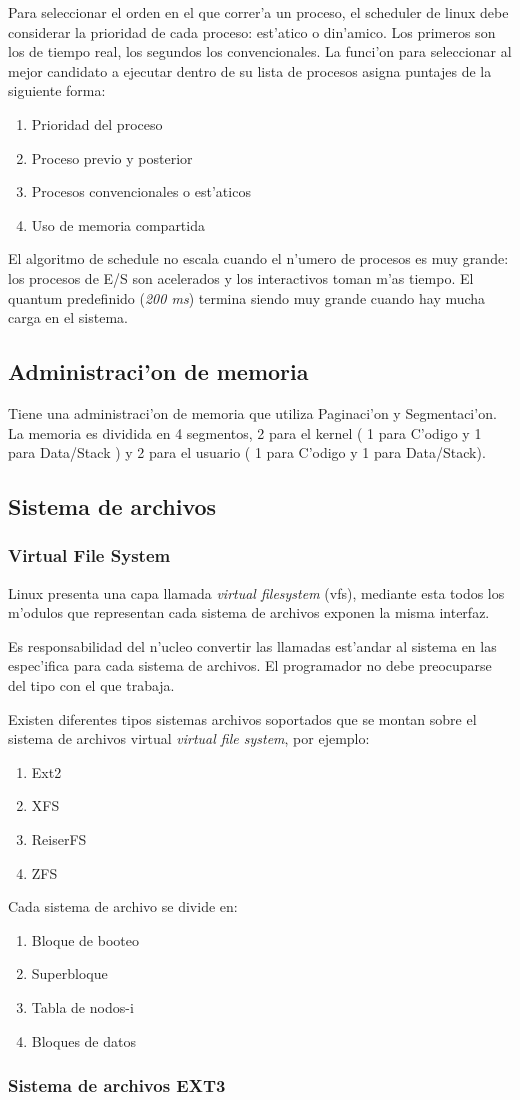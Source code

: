 Para seleccionar el orden en el que correr'a un proceso, el scheduler de linux debe considerar la prioridad de cada proceso: est'atico o din'amico. Los primeros son los de tiempo real, los segundos los convencionales. La funci'on para seleccionar al mejor candidato a ejecutar dentro de su lista de procesos asigna puntajes de la siguiente forma:
\begin{enumerate} 
\item Prioridad del proceso
\item Proceso previo y posterior
\item Procesos convencionales o est'aticos
\item Uso de memoria compartida
\end{enumerate}

El algoritmo de schedule no escala cuando el n'umero de procesos es muy grande: los procesos de E/S son acelerados y los interactivos toman m'as tiempo. El quantum predefinido (\textit{200 ms}) termina siendo muy grande cuando hay mucha carga en el sistema.

\subsection{Administraci'on de memoria}

Tiene una administraci'on de memoria que utiliza Paginaci'on y Segmentaci'on. La memoria es dividida en 4 segmentos, 2 para el kernel ( 1 para C'odigo y 1 para Data/Stack ) y 2 para el usuario ( 1 para C'odigo y 1 para Data/Stack).


\subsection{Sistema de archivos}

\subsubsection{Virtual File System}

Linux presenta una capa llamada \textit{virtual filesystem} (vfs), mediante esta todos los m'odulos que representan cada sistema de archivos exponen la misma interfaz.

Es responsabilidad del n'ucleo convertir las llamadas est'andar al sistema en las espec'ifica para cada sistema de archivos. El programador no debe preocuparse del tipo con el que trabaja.

Existen diferentes tipos sistemas archivos soportados que se montan sobre el sistema de archivos virtual \textit{virtual file system}, por ejemplo:
\begin{enumerate}
\item Ext2
\item XFS
\item ReiserFS
\item ZFS
\end{enumerate}

Cada sistema de archivo se divide en:
\begin{enumerate}
\item Bloque de booteo
\item Superbloque
\item Tabla de nodos-i
\item Bloques de datos
\end{enumerate}

\subsubsection{Sistema de archivos EXT3}
